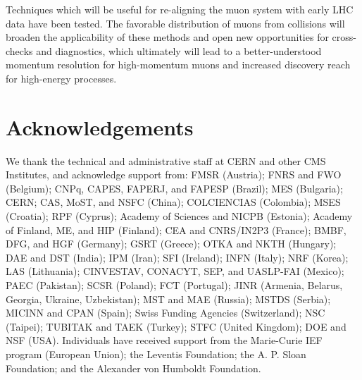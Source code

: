 \documentclass[11pt,twoside,a4paper,cmspaper]{cms-tdr}
\begin{document}
Techniques which will be useful for re-aligning
the muon system with early LHC data have been tested.  The favorable distribution of
muons from collisions will broaden the applicability of these methods
and open new opportunities for cross-checks and diagnostics, which
ultimately will lead to a better-understood momentum resolution for
high-momentum muons and increased discovery reach for high-energy
processes.

\section*{Acknowledgements}

We thank the technical and administrative staff at CERN and other CMS
Institutes, and acknowledge support from: FMSR (Austria); FNRS and FWO
(Belgium); CNPq, CAPES, FAPERJ, and FAPESP (Brazil); MES (Bulgaria);
CERN; CAS, MoST, and NSFC (China); COLCIENCIAS (Colombia); MSES
(Croatia); RPF (Cyprus); Academy of Sciences and NICPB (Estonia);
Academy of Finland, ME, and HIP (Finland); CEA and CNRS/IN2P3
(France); BMBF, DFG, and HGF (Germany); GSRT (Greece); OTKA and NKTH
(Hungary); DAE and DST (India); IPM (Iran); SFI (Ireland); INFN
(Italy); NRF (Korea); LAS (Lithuania); CINVESTAV, CONACYT, SEP, and
UASLP-FAI (Mexico); PAEC (Pakistan); SCSR (Poland); FCT (Portugal);
JINR (Armenia, Belarus, Georgia, Ukraine, Uzbekistan); MST and MAE
(Russia); MSTDS (Serbia); MICINN and CPAN (Spain); Swiss Funding
Agencies (Switzerland); NSC (Taipei); TUBITAK and TAEK (Turkey); STFC
(United Kingdom); DOE and NSF (USA). Individuals have received support
from the Marie-Curie IEF program (European Union); the Leventis
Foundation; the A. P. Sloan Foundation; and the Alexander von Humboldt
Foundation.

\end{document}
